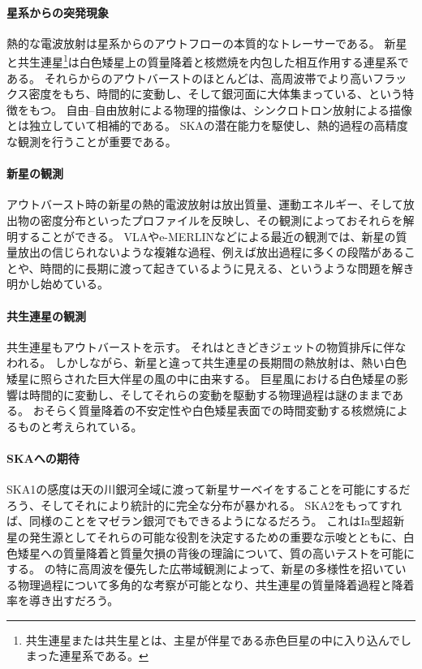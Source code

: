 \paragraph{星系からの突発現象}

熱的な電波放射は星系からのアウトフローの本質的なトレーサーである。
新星と共生連星\footnote{共生連星または共生星とは、主星が伴星である赤色巨星の中に入り込んでしまった連星系である。}は白色矮星上の質量降着と核燃焼を内包した相互作用する連星系である。
それらからのアウトバーストのほとんどは、高周波帯でより高いフラックス密度をもち、時間的に変動し、そして銀河面に大体集まっている、という特徴をもつ。
自由--自由放射による物理的描像は、シンクロトロン放射による描像とは独立していて相補的である。
SKAの潜在能力を駆使し、熱的過程の高精度な観測を行うことが重要である。

\paragraph{新星の観測}

アウトバースト時の新星の熱的電波放射は放出質量、運動エネルギー、そして放出物の密度分布といったプロファイルを反映し、その観測によっておそれらを解明することができる。
VLAやe-MERLINなどによる最近の観測では、新星の質量放出の信じられないような複雑な過程、例えば放出過程に多くの段階があることや、時間的に長期に渡って起きているように見える、というような問題を解き明かし始めている。

\paragraph{共生連星の観測}

共生連星もアウトバーストを示す。
それはときどきジェットの物質排斥に伴なわれる。
しかしながら、新星と違って共生連星の長期間の熱放射は、熱い白色矮星に照らされた巨大伴星の風の中に由来する。
巨星風における白色矮星の影響は時間的に変動し、そしてそれらの変動を駆動する物理過程は謎のままである。
おそらく質量降着の不安定性や白色矮星表面での時間変動する核燃焼によるものと考えられている。

\paragraph{SKAへの期待}

SKA1の感度は天の川銀河全域に渡って新星サーベイをすることを可能にするだろう、そしてそれにより統計的に完全な分布が暴かれる。
SKA2をもってすれば、同様のことをマゼラン銀河でもできるようになるだろう。
これはIa型超新星の発生源としてそれらの可能な役割を決定するための重要な示唆とともに、白色矮星への質量降着と質量欠損の背後の理論について、質の高いテストを可能にする。
の特に高周波を優先した広帯域観測によって、新星の多様性を招いている物理過程について多角的な考察が可能となり、共生連星の質量降着過程と降着率を導き出すだろう。

